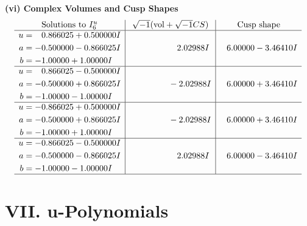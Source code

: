 \documentclass[1p]{elsarticle_modified}
\theoremstyle{definition}
\newcommand{\I}{\sqrt{-1}}
\begin{document}
\newpage\flushleft \textbf{(vi) Complex Volumes and Cusp Shapes}
$$\begin{array}{c|c|c}  
\text{Solutions to }I^u_{6}& \I (\text{vol} + \sqrt{-1}CS) & \text{Cusp shape}\\
 \hline 
\begin{aligned}
u &= \phantom{-}0.866025 + 0.500000 I \\
a &= -0.500000 - 0.866025 I \\
b &= -1.00000 + 1.00000 I\end{aligned}
 & \phantom{-0.000000 -}2.02988 I & \phantom{-}6.00000 - 3.46410 I \\ \hline\begin{aligned}
u &= \phantom{-}0.866025 - 0.500000 I \\
a &= -0.500000 + 0.866025 I \\
b &= -1.00000 - 1.00000 I\end{aligned}
 & \phantom{-0.000000 } -2.02988 I & \phantom{-}6.00000 + 3.46410 I \\ \hline\begin{aligned}
u &= -0.866025 + 0.500000 I \\
a &= -0.500000 + 0.866025 I \\
b &= -1.00000 + 1.00000 I\end{aligned}
 & \phantom{-0.000000 } -2.02988 I & \phantom{-}6.00000 + 3.46410 I \\ \hline\begin{aligned}
u &= -0.866025 - 0.500000 I \\
a &= -0.500000 - 0.866025 I \\
b &= -1.00000 - 1.00000 I\end{aligned}
 & \phantom{-0.000000 -}2.02988 I & \phantom{-}6.00000 - 3.46410 I\\
 \hline 
 \end{array}$$\newpage
\newpage\renewcommand{\arraystretch}{1}
\centering \section*{ VII. u-Polynomials}
\end{document}
